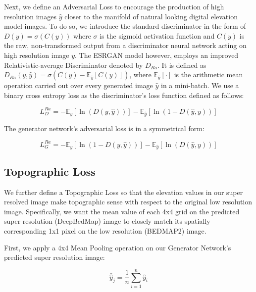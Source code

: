 \documentclass[tc, manuscript]{copernicus}
\begin{document}
Next, we define an Adversarial Loss to encourage the production of high resolution images $\hat{y}$ closer to the manifold of natural looking digital elevation model images.
To do so, we introduce the standard discriminator in the form of $D(y) = \sigma(C(y))$ where $\sigma$ is the sigmoid activation function and $C(y)$ is the raw, non-transformed output from a discriminator neural network acting on high resolution image $y$.
The ESRGAN model \citep{WangESRGANEnhancedSuperResolution2018} however, employs an improved Relativistic-average Discriminator \citep{Jolicoeur-Martineaurelativisticdiscriminatorkey2018} denoted by $D_{Ra}$.
It is defined as $D_{Ra}(y,\hat{y}) = \sigma(C(y) - \mathbb{E}_{\hat{y}}[C(\hat{y})])$, where $\mathbb{E}_{\hat{y}}[\cdot]$ is the arithmetic mean operation carried out over every generated image $\hat{y}$ in a mini-batch.
We use a binary cross entropy loss as the discriminator's loss function defined as follows:

\begin{equation}\label{eq:A2}
  L_D^{Ra} = - \mathbb{E}_y[\ln(D(y,\hat{y}))] - \mathbb{E}_{\hat{y}}[\ln(1 - D(\hat{y},y))]
\end{equation}

The generator network's adversarial loss is in a symmetrical form:

\begin{equation}\label{eq:A3}
  L_G^{Ra} = - \mathbb{E}_y[\ln(1 - D(y,\hat{y}))] - \mathbb{E}_{\hat{y}}[\ln(D(\hat{y},y))]
\end{equation}

\subsection{Topographic Loss}

We further define a Topographic Loss so that the elevation values in our super resolved image make topographic sense with respect to the original low resolution image.
Specifically, we want the mean value of each 4x4 grid on the predicted super resolution (DeepBedMap) image to closely match its spatially corresponding 1x1 pixel on the low resolution (BEDMAP2) image.

First, we apply a 4x4 Mean Pooling operation on our Generator Network's predicted super resolution image:

\begin{equation}\label{eq:A4}
 \bar{\hat{y}}_j = \dfrac{1}{n} \sum\limits_{i=1}^n \hat{y}_i
\end{equation}
\end{document}
